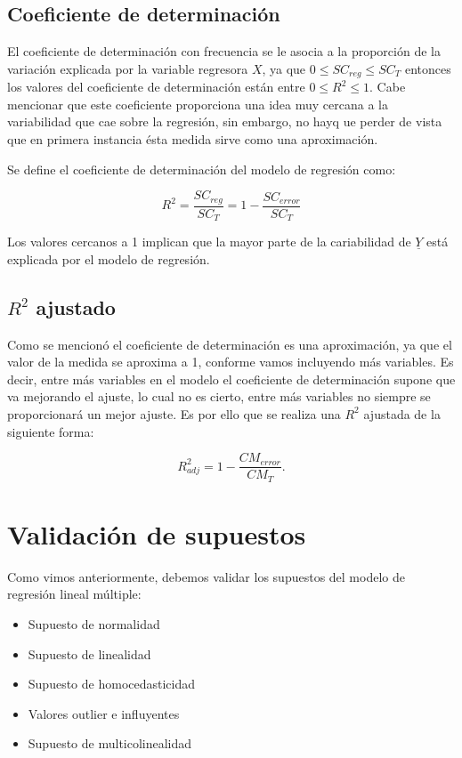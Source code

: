 \documentclass[
  a4paper,
  oneside,
  openany]{book}
\begin{document}
\hypertarget{coeficiente-de-determinaciuxf3n-1}{%
\section{Coeficiente de determinación}\label{coeficiente-de-determinaciuxf3n-1}}

El coeficiente de determinación con frecuencia se le asocia a la proporción de la variación explicada por la variable regresora \(X\), ya que \(0 \leq SC_{reg} \leq SC_{T}\) entonces los valores del coeficiente de determinación están entre \(0 \leq R^2 \leq 1.\) Cabe mencionar que este coeficiente proporciona una idea muy cercana a la variabilidad que cae sobre la regresión, sin embargo, no hayq ue perder de vista que en primera instancia ésta medida sirve como una aproximación.

Se define el coeficiente de determinación del modelo de regresión como:

\[R^2=\frac{SC_{reg}}{SC_{T}}=1-\frac{SC_{error}}{SC_{T}}\]

Los valores cercanos a 1 implican que la mayor parte de la cariabilidad de \(\underline{Y}\) está explicada por el modelo de regresión.

\hypertarget{r2-ajustado}{%
\section{\texorpdfstring{\(R^2\) ajustado}{R\^{}2 ajustado}}\label{r2-ajustado}}

Como se mencionó el coeficiente de determinación es una aproximación, ya que el valor de la medida se aproxima a 1, conforme vamos incluyendo más variables. Es decir, entre más variables en el modelo el coeficiente de determinación supone que va mejorando el ajuste, lo cual no es cierto, entre más variables no siempre se proporcionará un mejor ajuste.
Es por ello que se realiza una \(R^2\) ajustada de la siguiente forma:

\[R^2_{adj}=1- \frac{CM_{error}}{CM_{T}}.\]

\hypertarget{validaciuxf3n-de-supuestos-1}{%
\chapter{Validación de supuestos}\label{validaciuxf3n-de-supuestos-1}}

Como vimos anteriormente, debemos validar los supuestos del modelo de regresión lineal múltiple:

\begin{itemize}
\item
  Supuesto de normalidad
\item
  Supuesto de linealidad
\item
  Supuesto de homocedasticidad
\item
  Valores outlier e influyentes
\item
  Supuesto de multicolinealidad
\end{itemize}
\end{document}
